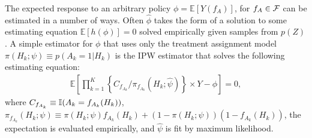 \documentclass{article}
\newcommand{\E}{\mathbb{E}}
\begin{document}
The expected response to an arbitrary policy $\phi = \E[Y({f}_{A})]$, for ${f_A} \in {\cal F}$ can be estimated in a number of ways. 
Often $\widehat{\phi}$ takes the form of a solution to some estimating equation $\E[ h(\phi) ] = 0$ solved empirically given samples from $p(Z)$.  
A simple estimator for $\phi$ that uses only the treatment assignment model $\pi(H_k; \psi) \equiv p(A_k=1 | H_k)$ is the IPW estimator that solves the following estimating equation:
{\small
\begin{align}
\label{eqn:ipw}  
\E\left[  \prod_{k = 1}^{K} \left\{ C_{f_{A_k}} / \pi_{f_{A_k}}(H_k; \widehat{\psi})  \right\} \times Y  - \phi \right] = 0, 
\end{align}
}%
where $\small C_{f_{A_k}} \equiv \mathbb{I}(A_k = f_{A_k}(H_k))$,
$\pi_{f_{A_k}}(H_k;\psi) \equiv \pi(H_k;\psi) f_{A_k}(H_k) + (1-\pi(H_k;\psi)) (1 - f_{A_k}(H_k))$,
the expectation is evaluated empirically, and $\widehat{\psi}$ is fit by maximum likelihood.
\end{document}
